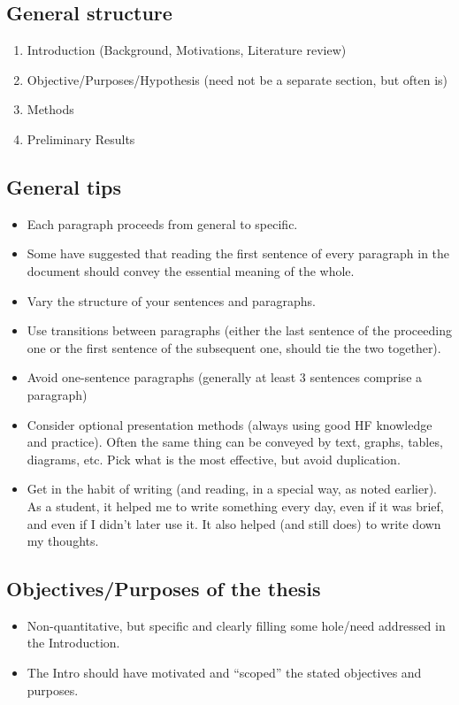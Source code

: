 \subsection*{General structure}
\begin{enumerate}
	\item Introduction (Background, Motivations, Literature review)
	\item Objective/Purposes/Hypothesis (need not be a separate section, but often is)
	\item Methods
	\item Preliminary Results
\end{enumerate}

\subsection*{General tips}
\begin{itemize}
  \item Each paragraph proceeds from general to specific.
  \item Some have suggested that reading the first sentence of every paragraph in the document
  should convey the essential meaning of the whole.
  \item Vary the structure of your sentences and paragraphs.
  \item Use transitions between paragraphs (either the last sentence of the proceeding one
  or the first sentence of the subsequent one, should tie the two together).
  \item Avoid one-sentence paragraphs (generally at least 3 sentences comprise a paragraph)
  \item Consider optional presentation methods (always using good HF knowledge and
  practice). Often the same thing can be conveyed by text, graphs, tables, diagrams,
  etc. Pick what is the most effective, but avoid duplication.
  \item Get in the habit of writing (and reading, in a special way, as noted earlier). As a student,
  it helped me to write something every day, even if it was brief, and even if I didn’t later use it. 
  It also helped (and still does) to write down my thoughts.
\end{itemize}

\subsection*{Objectives/Purposes of the thesis}
\begin{itemize}
  \item Non-quantitative, but specific and clearly filling some hole/need addressed in the
  Introduction.
  \item The Intro should have motivated and “scoped” the stated objectives and purposes.
\end{itemize}


